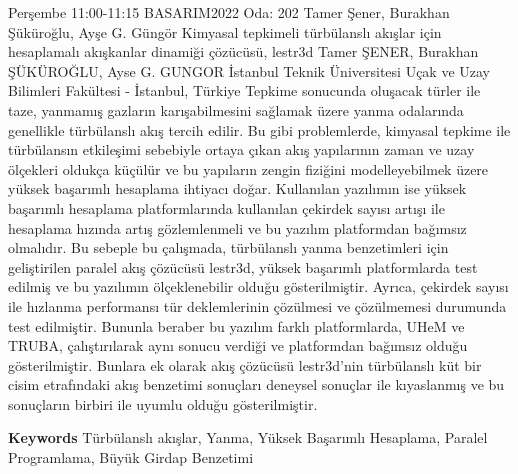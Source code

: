
    \begin{abstract_basarim}
    {Perşembe 11:00-11:15}
    {BASARIM2022}
    {Oda: 202}
    {Tamer Şener, Burakhan Şüküroğlu, Ayşe G. Güngör}
    {Kimyasal tepkimeli türbülanslı akışlar için hesaplamalı akışkanlar dinamiği çözücüsü, lestr3d}
    {%
    Tamer ŞENER, Burakhan ŞÜKÜROĞLU, Ayse G. GUNGOR}
    {%
    }
    {%
    İstanbul Teknik Üniversitesi Uçak ve Uzay Bilimleri Fakültesi - İstanbul, Türkiye}
    Tepkime sonucunda oluşacak türler ile taze, yanmamış gazların karışabilmesini sağlamak üzere yanma odalarında genellikle türbülanslı akış tercih edilir. Bu gibi problemlerde, kimyasal tepkime ile türbülansın etkileşimi sebebiyle ortaya çıkan akış yapılarının zaman ve uzay ölçekleri oldukça küçülür ve bu yapıların zengin fiziğini modelleyebilmek üzere yüksek başarımlı hesaplama ihtiyacı doğar. Kullanılan yazılımın ise yüksek başarımlı hesaplama platformlarında kullanılan çekirdek sayısı artışı ile hesaplama hızında artış gözlemlenmeli ve bu yazılım platformdan bağımsız olmalıdır. Bu sebeple bu çalışmada, türbülanslı yanma benzetimleri için geliştirilen paralel akış çözücüsü lestr3d, yüksek başarımlı platformlarda test edilmiş ve bu yazılımın ölçeklenebilir olduğu gösterilmiştir. Ayrıca, çekirdek sayısı ile hızlanma performansı tür deklemlerinin çözülmesi ve çözülmemesi durumunda test edilmiştir. Bununla beraber bu yazılım farklı platformlarda, UHeM ve TRUBA, çalıştırılarak aynı sonucu verdiği ve platformdan bağımsız olduğu gösterilmiştir. Bunlara ek olarak akış çözücüsü lestr3d’nin türbülanslı küt bir cisim etrafındaki akış benzetimi sonuçları deneysel sonuçlar ile kıyaslanmış ve bu sonuçların birbiri ile uyumlu olduğu gösterilmiştir. 
    
        \textbf{Keywords} \newline{}Türbülanslı akışlar, Yanma, Yüksek Başarımlı Hesaplama, Paralel Programlama, Büyük Girdap Benzetimi
    \end{abstract_basarim}
    